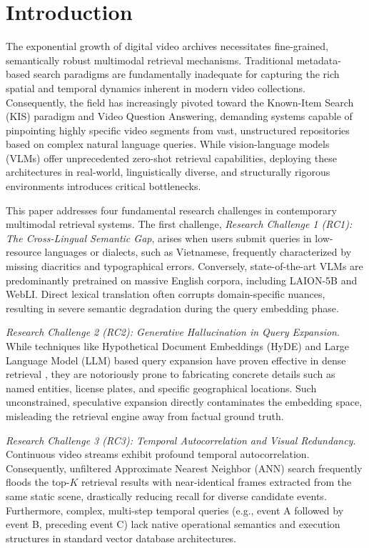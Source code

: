 \section{Introduction}\label{sec:intro}

The exponential growth of digital video archives necessitates fine-grained, semantically robust multimodal retrieval mechanisms. Traditional metadata-based search paradigms are fundamentally inadequate for capturing the rich spatial and temporal dynamics inherent in modern video collections. Consequently, the field has increasingly pivoted toward the Known-Item Search (KIS) paradigm and Video Question Answering, demanding systems capable of pinpointing highly specific video segments from vast, unstructured repositories based on complex natural language queries. While vision-language models (VLMs) \cite{radford2021learning, zhai2023sigmoid} offer unprecedented zero-shot retrieval capabilities, deploying these architectures in real-world, linguistically diverse, and structurally rigorous environments introduces critical bottlenecks.

This paper addresses four fundamental research challenges in contemporary multimodal retrieval systems. The first challenge, \textit{Research Challenge 1 (RC1): The Cross-Lingual Semantic Gap}, arises when users submit queries in low-resource languages or dialects, such as Vietnamese, frequently characterized by missing diacritics and typographical errors. Conversely, state-of-the-art VLMs are predominantly pretrained on massive English corpora, including LAION-5B \cite{schuhmann2022laion} and WebLI. Direct lexical translation often corrupts domain-specific nuances, resulting in severe semantic degradation during the query embedding phase.

\textit{Research Challenge 2 (RC2): Generative Hallucination in Query Expansion}. While techniques like Hypothetical Document Embeddings (HyDE) \cite{gao2023precise} and Large Language Model (LLM) based query expansion have proven effective in dense retrieval \cite{chen2024bge}, they are notoriously prone to fabricating concrete details such as named entities, license plates, and specific geographical locations. Such unconstrained, speculative expansion directly contaminates the embedding space, misleading the retrieval engine away from factual ground truth.

\textit{Research Challenge 3 (RC3): Temporal Autocorrelation and Visual Redundancy}. Continuous video streams exhibit profound temporal autocorrelation. Consequently, unfiltered Approximate Nearest Neighbor (ANN) search frequently floods the top-$K$ retrieval results with near-identical frames extracted from the same static scene, drastically reducing recall for diverse candidate events. Furthermore, complex, multi-step temporal queries (e.g., event A followed by event B, preceding event C) lack native operational semantics and execution structures in standard vector database architectures.

